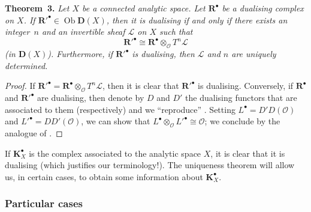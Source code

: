 \documentclass[british]{article}
\newenvironment{itenv}[1]
  {\phantomsection\par\smallskip\noindent\textbf{#1.}\itshape}
  {\par\smallskip}
\begin{document}
\protect{}\label{theorem-3}
\begin{itenv}{Theorem 3}
Let \(X\) be a connected analytic space. Let \(\mathbf{R}^\bullet\) be a
dualising complex on \(X\). If
\({\mathbf{R}'}^\bullet\in\operatorname{Ob}\mathbf{D}(X)\), then it is
dualising if and only if there exists an integer~\(n\) and an invertible
sheaf \({\mathscr{L}}\) on \(X\) such that \[
  {\mathbf{R}'}^\bullet \cong \mathbf{R}^\bullet\otimes_{{\mathscr{O}}}T^n{\mathscr{L}}
\] (in \(\mathbf{D}(X)\)). Furthermore, if \({\mathbf{R}'}^\bullet\) is
dualising, then \({\mathscr{L}}\) and \(n\) are uniquely determined.

\end{itenv}

\begin{proof}
If
\({\mathbf{R}'}^\bullet=\mathbf{R}^\bullet\otimes_{{\mathscr{O}}}T^n{\mathscr{L}}\),
then it is clear that \({\mathbf{R}'}^\bullet\) is dualising.
Conversely, if \(\mathbf{R}^\bullet\) and \({\mathbf{R}'}^\bullet\) are
dualising, then denote by \(D\) and \(D'\) the dualising functors that
are associated to them (respectively) and we ``reproduce''
\autocite[Chapter~V, (3.1)]{7}. Setting \(L^\bullet=D'D({\mathscr{O}})\)
and \({L'}^\bullet=DD'({\mathscr{O}})\), we can show that
\(L^\bullet\otimes_{{\mathscr{O}}}{L'}^\bullet\cong{\mathscr{O}}\); we
conclude by the analogue of \autocite[Chapter~V, (3.3)]{7}.
\end{proof}

If \(\mathbf{K}_X^\bullet\) is the complex associated to the analytic
space \(X\), it is clear that it is dualising (which justifies our
terminology!). The uniqueness theorem will allow us, in certain cases,
to obtain some information about \(\mathbf{K}_X^\bullet\).

\subsubsection*{Particular cases}\label{particular-cases}
\end{document}
